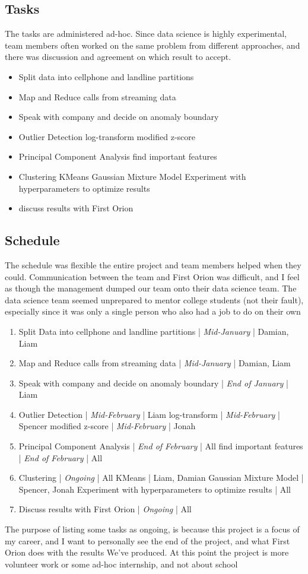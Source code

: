 \documentclass[20pt]{article} %
\begin{document}
\subsection{Tasks}
The tasks are administered ad-hoc.  Since data science is highly experimental, team members often worked on the same problem from different approaches, and there was discussion and agreement on which result to accept.
\begin{itemize}
\item Split data into cellphone and landline partitions
\item Map and Reduce calls from streaming data
\item Speak with company and decide on anomaly boundary
\item Outlier Detection
\subitem log-transform
\subitem modified z-score
\item Principal Component Analysis
\subitem find important features
\item Clustering
\subitem KMeans
\subitem Gaussian Mixture Model
\subitem Experiment with hyperparameters to optimize results
\item discuss results with First Orion
\end{itemize}
\newpage
\subsection{Schedule}
The schedule was flexible the entire project and team members helped when they could.  Communication between the team and First Orion was difficult, and I feel as though the management dumped our team onto their data science team.  The data science team seemed unprepared to mentor college students (not their fault), especially since it was only a single person who also had a job to do on their own
\begin{enumerate}
\item Split Data into cellphone and landline partitions | \textit{Mid-January} | Damian, Liam
\item Map and Reduce calls from streaming data | \textit{Mid-January} | Damian, Liam
\item Speak with company and decide on anomaly boundary | \textit{End of January} | Liam
\item Outlier Detection | \textit{Mid-February} | Liam
\subitem log-transform | \textit{Mid-February} | Spencer
\subitem modified z-score | \textit{Mid-February} | Jonah
\item Principal Component Analysis | \textit{End of February} | All
\subitem find important features | \textit{End of February} | All
\item Clustering | \textit{Ongoing} | All 
\subitem KMeans | Liam, Damian
\subitem Gaussian Mixture Model | Spencer, Jonah
\subitem Experiment with hyperparameters to optimize results | All
\item Discuss results with First Orion | \textit{Ongoing} | All
\end{enumerate}
The purpose of listing some tasks as ongoing, is because this project is a focus of my career, and I want to personally see the end of the project, and what First Orion does with the results We've produced.  At this point the project is more volunteer work or some ad-hoc internship, and not about school
\end{document}

